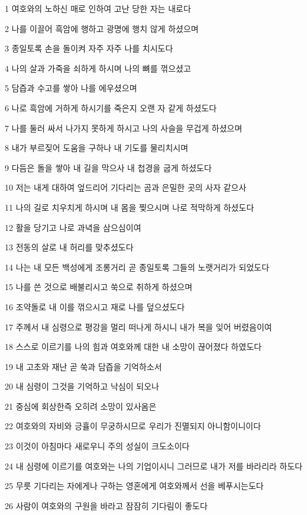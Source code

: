 \par 1 여호와의 노하신 매로 인하여 고난 당한 자는 내로다
\par 2 나를 이끌어 흑암에 행하고 광명에 행치 않게 하셨으며
\par 3 종일토록 손을 돌이켜 자주 자주 나를 치시도다
\par 4 나의 살과 가죽을 쇠하게 하시며 나의 뼈를 꺾으셨고
\par 5 담즙과 수고를 쌓아 나를 에우셨으며
\par 6 나로 흑암에 거하게 하시기를 죽은지 오랜 자 같게 하셨도다
\par 7 나를 둘러 싸서 나가지 못하게 하시고 나의 사슬을 무겁게 하셨으며
\par 8 내가 부르짖어 도움을 구하나 내 기도를 물리치시며
\par 9 다듬은 돌을 쌓아 내 길을 막으사 내 첩경을 굽게 하셨도다
\par 10 저는 내게 대하여 엎드리어 기다리는 곰과 은밀한 곳의 사자 같으사
\par 11 나의 길로 치우치게 하시며 내 몸을 찢으시며 나로 적막하게 하셨도다
\par 12 활을 당기고 나로 과녁을 삼으심이여
\par 13 전동의 살로 내 허리를 맞추셨도다
\par 14 나는 내 모든 백성에게 조롱거리 곧 종일토록 그들의 노랫거리가 되었도다
\par 15 나를 쓴 것으로 배불리시고 쑥으로 취하게 하셨으며
\par 16 조약돌로 내 이를 꺾으시고 재로 나를 덮으셨도다
\par 17 주께서 내 심령으로 평강을 멀리 떠나게 하시니 내가 복을 잊어 버렸음이여
\par 18 스스로 이르기를 나의 힘과 여호와께 대한 내 소망이 끊어졌다 하였도다
\par 19 내 고초와 재난 곧 쑥과 담즙을 기억하소서
\par 20 내 심령이 그것을 기억하고 낙심이 되오나
\par 21 중심에 회상한즉 오히려 소망이 있사옴은
\par 22 여호와의 자비와 긍휼이 무궁하시므로 우리가 진멸되지 아니함이니이다
\par 23 이것이 아침마다 새로우니 주의 성실이 크도소이다
\par 24 내 심령에 이르기를 여호와는 나의 기업이시니 그러므로 내가 저를 바라리라 하도다
\par 25 무릇 기다리는 자에게나 구하는 영혼에게 여호와께서 선을 베푸시는도다
\par 26 사람이 여호와의 구원을 바라고 잠잠히 기다림이 좋도다

